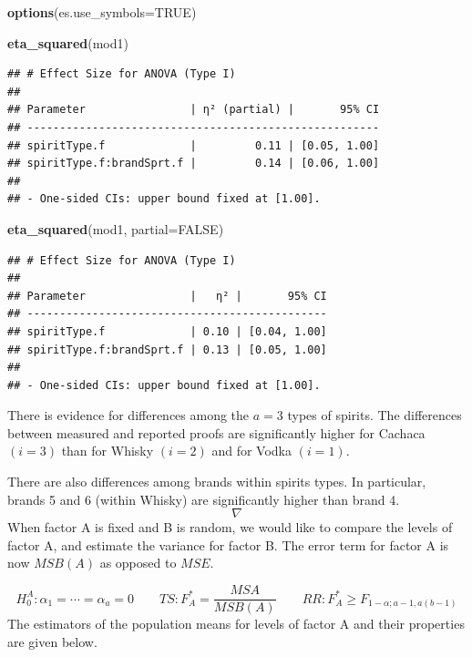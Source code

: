 \documentclass[
]{book}
\newenvironment{Shaded}{\begin{snugshade}}{\end{snugshade}}
\newcommand{\AttributeTok}[1]{\textcolor[rgb]{0.13,0.29,0.53}{#1}}
\newcommand{\ConstantTok}[1]{\textcolor[rgb]{0.56,0.35,0.01}{#1}}
\newcommand{\FunctionTok}[1]{\textcolor[rgb]{0.13,0.29,0.53}{\textbf{#1}}}
\newcommand{\NormalTok}[1]{#1}
\begin{document}
\begin{Shaded}
\begin{Highlighting}[]
\FunctionTok{options}\NormalTok{(}\AttributeTok{es.use\_symbols=}\ConstantTok{TRUE}\NormalTok{)}

\FunctionTok{eta\_squared}\NormalTok{(mod1)}
\end{Highlighting}
\end{Shaded}

\begin{verbatim}
## # Effect Size for ANOVA (Type I)
## 
## Parameter                | η² (partial) |       95% CI
## ------------------------------------------------------
## spiritType.f             |         0.11 | [0.05, 1.00]
## spiritType.f:brandSprt.f |         0.14 | [0.06, 1.00]
## 
## - One-sided CIs: upper bound fixed at [1.00].
\end{verbatim}

\begin{Shaded}
\begin{Highlighting}[]
\FunctionTok{eta\_squared}\NormalTok{(mod1, }\AttributeTok{partial=}\ConstantTok{FALSE}\NormalTok{)}
\end{Highlighting}
\end{Shaded}

\begin{verbatim}
## # Effect Size for ANOVA (Type I)
## 
## Parameter                |   η² |       95% CI
## ----------------------------------------------
## spiritType.f             | 0.10 | [0.04, 1.00]
## spiritType.f:brandSprt.f | 0.13 | [0.05, 1.00]
## 
## - One-sided CIs: upper bound fixed at [1.00].
\end{verbatim}

There is evidence for differences among the \(a=3\) types of spirits.
The differences between measured and reported proofs are significantly
higher for Cachaca \((i=3)\) than for Whisky \((i=2)\) and for Vodka
\((i=1)\).

There are also differences among brands within spirits types. In
particular, brands 5 and 6 (within Whisky) are significantly higher than
brand 4. \[\nabla \] When factor A is fixed and B is random, we would
like to compare the levels of factor A, and estimate the variance for
factor B. The error term for factor A is now \(MSB(A)\) as opposed to
\(MSE\).

\[
H_0^A: \alpha_1=\cdots = \alpha_a=0 \qquad
TS: F_A^*=\frac{MSA}{MSB(A)}   \qquad
RR: F_A^* \geq F_{1-\alpha;a-1,a(b-1)}
\] The estimators of the population means for levels of factor A and
their properties are given below.
\end{document}
